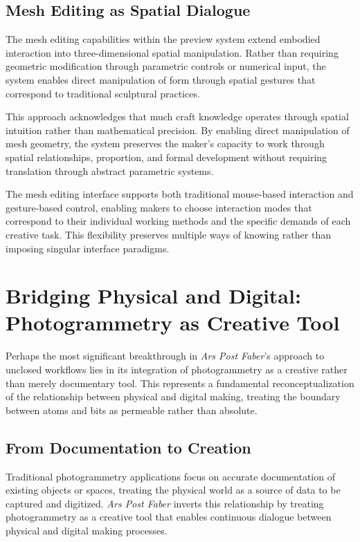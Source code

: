\subsection{Mesh Editing as Spatial Dialogue}

The mesh editing capabilities within the preview system extend embodied interaction into three-dimensional spatial manipulation. Rather than requiring geometric modification through parametric controls or numerical input, the system enables direct manipulation of form through spatial gestures that correspond to traditional sculptural practices.

\vspace{0.5cm}

This approach acknowledges that much craft knowledge operates through spatial intuition rather than mathematical precision. By enabling direct manipulation of mesh geometry, the system preserves the maker's capacity to work through spatial relationships, proportion, and formal development without requiring translation through abstract parametric systems.

\vspace{0.5cm}

The mesh editing interface supports both traditional mouse-based interaction and gesture-based control, enabling makers to choose interaction modes that correspond to their individual working methods and the specific demands of each creative task. This flexibility preserves multiple ways of knowing rather than imposing singular interface paradigms.

\section{Bridging Physical and Digital: Photogrammetry as Creative Tool}

Perhaps the most significant breakthrough in \textit{Ars Post Faber}'s approach to unclosed workflows lies in its integration of photogrammetry as a creative rather than merely documentary tool. This represents a fundamental reconceptualization of the relationship between physical and digital making, treating the boundary between atoms and bits as permeable rather than absolute.

\subsection{From Documentation to Creation}

Traditional photogrammetry applications focus on accurate documentation of existing objects or spaces, treating the physical world as a source of data to be captured and digitized. \textit{Ars Post Faber} inverts this relationship by treating photogrammetry as a creative tool that enables continuous dialogue between physical and digital making processes.

